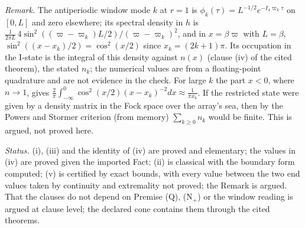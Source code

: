 \emph{Remark.} The antiperiodic window mode $k$ at $r = 1$ is $\phi_{k}(\tau) = L^{-1/2}e^{-I_4\varpi_{k}\tau}$ on $[0, L]$ and zero elsewhere; its spectral density in $h$ is $\tfrac{1}{2\pi L}\,4\sin^{2}((\varpi - \varpi_{k})L/2)/(\varpi - \varpi_{k})^{2}$, and in $x = \beta\varpi$ with $L = \beta$, $\sin^{2}((x - x_{k})/2) = \cos^{2}(x/2)$ since $x_{k} = (2k + 1)\pi$. Its occupation in the I-state is the integral of this density against $n(x)$ (clause (iv) of the cited theorem), the stated $n_{k}$; the numerical values are from a floating-point quadrature and are not evidence in the check. For large $k$ the part $x < 0$, where $n \to 1$, gives $\tfrac{2}{\pi}\int_{-\infty}^{0}\cos^{2}(x/2)(x - x_{k})^{-2}dx \approx \tfrac{1}{\pi x_{k}}$. If the restricted state were given by a density matrix in the Fock space over the array's sea, then by the Powers and Stormer criterion (from memory) $\sum_{k \ge 0}n_{k}$ would be finite. This is argued, not proved here.

\emph{Status.} (i), (iii) and the identity of (iv) are proved and elementary; the values in (iv) are proved given the imported Fact; (ii) is classical with the boundary form computed; (v) is certified by exact bounds, with every value between the two end values taken by continuity and extremality not proved; the Remark is argued. That the clauses do not depend on Premise (Q), (N$_{+}$) or the window reading is argued at clause level; the declared cone contains them through the cited theorems.

